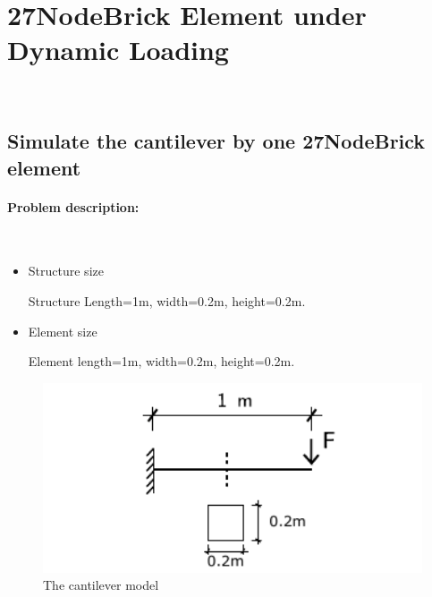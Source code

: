 
\newpage
\section{27NodeBrick Element under Dynamic Loading} ~ 
\subsection{Simulate the cantilever by one 27NodeBrick element} 
\paragraph{Problem description:} ~

\begin{itemize}
  \item Structure size

    Structure Length=1m, width=0.2m, height=0.2m.

  \item Element size

    Element length=1m, width=0.2m, height=0.2m.
\end{itemize}

\begin{figure}[!htb]
  \centering
  \includegraphics[width=12cm]{./Figure-files/_Chapter_Appendix_Illustrative_Examples/cantilever.pdf}
  \caption{The cantilever model}
  \label{fig_cantilev_1}
\end{figure}


